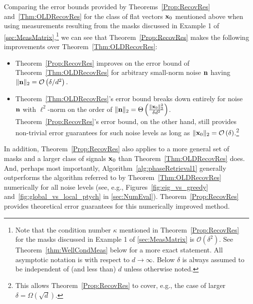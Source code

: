 Comparing the error bounds provided by Theorems~\ref{Prop:RecovRes} and~\ref{Thm:OLDRecovRes} for the class of flat vectors $\mathbf x_0$ mentioned above when using measurements resulting from the masks discussed in Example 1 of \cref{sec:MeasMatrix},\footnote{Note that the condition number $\kappa$ mentioned in Theorem~\ref{Prop:RecovRes} for the masks discussed in Example 1 of \cref{sec:MeasMatrix} is $\mathcal{O}(\delta^2)$.  See Theorem~\ref{thm:WellCondMeas} below for a more exact statement.  All asymptotic notation is with respect to $d \rightarrow \infty$.  Below $\delta$ is always assumed to be independent of (and less than) $d$ unless otherwise noted.} we can see that  Theorem~\ref{Prop:RecovRes} makes the following improvements over Theorem~\ref{Thm:OLDRecovRes}:
\begin{itemize}
\item Theorem~\ref{Prop:RecovRes} improves on the error bound of Theorem~\ref{Thm:OLDRecovRes} for arbitrary small-norm noise $\mathbf n$ having $\| \mathbf n \|_2 = \mathcal{O} \left( \delta / d^2 \right).$
\item Theorem~\ref{Thm:OLDRecovRes}'s error bound breaks down entirely for noise $\mathbf n$ with $\ell^2$-norm on the order of $\| \mathbf n \|_2 = \Theta \left( \frac{\| \mathbf x_0 \|^2_2}{\delta d^2} \right)$.   Theorem~\ref{Prop:RecovRes}'s error bound, on the other hand, still provides non-trivial error guarantees for such noise levels as long as $\| \mathbf x_0 \|_2 = \mathcal{O}\left( \delta \right)$.\footnote{This allows Theorem~\ref{Prop:RecovRes} to cover, e.g., the case of larger $\delta = \Omega \left( \sqrt{d} \right)$.}
\end{itemize}
In addition, Theorem~\ref{Prop:RecovRes} also applies to a more general set of masks and a larger class of signals $\mathbf x_0$ than Theorem~\ref{Thm:OLDRecovRes} does.  And, perhaps most importantly, Algorithm~\ref{alg:phaseRetrieval1} generally outperforms the algorithm referred to by Theorem~\ref{Thm:OLDRecovRes} numerically for all noise levels (see, e.g., Figures~\ref{fig:eig_vs_greedy} and~\ref{fig:global_vs_local_ptych} in \cref{sec:NumEval}).  Theorem~\ref{Prop:RecovRes} provides theoretical error guarantees for this numerically improved method.

